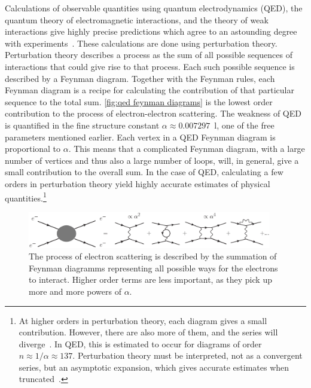 Calculations of observable quantities using quantum electrodynamics (QED), the quantum theory of electromagnetic interactions, and the theory of weak interactions give highly precise predictions which agree to an astounding degree with experiments~\cite{Schwartz:QFT}.
These calculations are done using perturbation theory.
Perturbation theory describes a process as the sum of all possible sequences of interactions that could give rise to that process.
Each such possible sequence is described by a Feynman diagram.
Together with the Feynman rules, each Feynman diagram is a recipe for calculating the contribution of that particular sequence to the total sum.
\autoref{fig:qed feynman diagrams} is the lowest order contribution to the process of electron-electron scattering.
The weakness of QED is quantified in the fine structure constant $\alpha \approx 0.00 7297$~\cite{PDG}l, one of the free parameters mentioned earlier.
Each vertex in a QED Feynman diagram is proportional to $\alpha$.
This means that a complicated Feynman diagram, with a large number of vertices and thus also a large number of loops, will, in general, give a small contribution to the overall sum.
In the case of QED, calculating a few orders in perturbation theory yield highly accurate estimates of physical quantities.\footnote{At higher orders in perturbation theory, each diagram gives a small contribution. However, there are also more of them, and the series will diverge~\cite{dyson:divergence_of_perturbation}. In QED, this is estimated to occur for diagrams of order $n \approx 1 / \alpha \approx 137$. Perturbation theory must be interpreted, not as a convergent series, but an asymptotic expansion, which gives accurate estimates when truncated~\cite{flory:how_i_learn_to_stop}.}

\begin{figure}[h]
    \centering
    \includegraphics[width=0.95\textwidth]{figurer/feynman-diagram/sum_qed.eps}
    \caption{The process of electron scattering is described by the summation of Feynman diagramms representing all possible ways for the electrons to interact. Higher order terms are less important, as they pick up more and more powers of $\alpha$.}
    \label{fig:qed feynman diagrams}
\end{figure}

